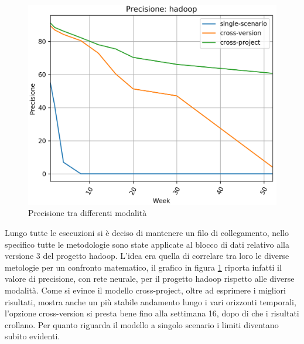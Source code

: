 \documentclass[%
    corpo=12pt,
    twoside,
    oldstyle,
    autoretitolo,
    greek,
    evenboxes,
]{toptesi}
\begin{document}
\begin{figure}[!ht]
  \includegraphics[width=\linewidth]{figure/andamento.png}
  \caption{Precisione tra differenti modalità}
  \label{fig:andamento}
\end{figure}
Lungo tutte le esecuzioni si è deciso di mantenere un filo di collegamento, nello specifico tutte le metodologie sono state applicate al blocco di dati relativo alla versione 3 del progetto hadoop. L'idea era quella di correlare tra loro le diverse metologie per un confronto matematico, il grafico in figura \ref{fig:andamento} riporta infatti il valore di precisione, con rete neurale, per il progetto hadoop rispetto alle diverse modalità. Come si evince il modello cross-project, oltre ad esprimere i migliori risultati, mostra anche un più stabile andamento lungo i vari orizzonti temporali, l'opzione cross-version si presta bene fino alla settimana 16, dopo di che i risultati crollano. Per quanto riguarda il modello a singolo scenario i limiti diventano subito evidenti.
\end{document}
